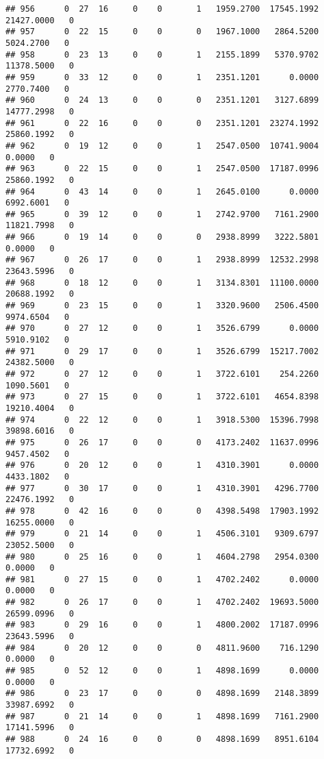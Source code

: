 \documentclass[
]{article}
\begin{document}
\begin{enumerate}
\begin{verbatim}
## 956      0  27  16     0    0       1   1959.2700  17545.1992  21427.0000   0
## 957      0  22  15     0    0       0   1967.1000   2864.5200   5024.2700   0
## 958      0  23  13     0    0       1   2155.1899   5370.9702  11378.5000   0
## 959      0  33  12     0    0       1   2351.1201      0.0000   2770.7400   0
## 960      0  24  13     0    0       0   2351.1201   3127.6899  14777.2998   0
## 961      0  22  16     0    0       0   2351.1201  23274.1992  25860.1992   0
## 962      0  19  12     0    0       1   2547.0500  10741.9004      0.0000   0
## 963      0  22  15     0    0       1   2547.0500  17187.0996  25860.1992   0
## 964      0  43  14     0    0       1   2645.0100      0.0000   6992.6001   0
## 965      0  39  12     0    0       1   2742.9700   7161.2900  11821.7998   0
## 966      0  19  14     0    0       0   2938.8999   3222.5801      0.0000   0
## 967      0  26  17     0    0       1   2938.8999  12532.2998  23643.5996   0
## 968      0  18  12     0    0       1   3134.8301  11100.0000  20688.1992   0
## 969      0  23  15     0    0       1   3320.9600   2506.4500   9974.6504   0
## 970      0  27  12     0    0       1   3526.6799      0.0000   5910.9102   0
## 971      0  29  17     0    0       1   3526.6799  15217.7002  24382.5000   0
## 972      0  27  12     0    0       1   3722.6101    254.2260   1090.5601   0
## 973      0  27  15     0    0       1   3722.6101   4654.8398  19210.4004   0
## 974      0  22  12     0    0       1   3918.5300  15396.7998  39898.6016   0
## 975      0  26  17     0    0       0   4173.2402  11637.0996   9457.4502   0
## 976      0  20  12     0    0       1   4310.3901      0.0000   4433.1802   0
## 977      0  30  17     0    0       1   4310.3901   4296.7700  22476.1992   0
## 978      0  42  16     0    0       0   4398.5498  17903.1992  16255.0000   0
## 979      0  21  14     0    0       1   4506.3101   9309.6797  23052.5000   0
## 980      0  25  16     0    0       1   4604.2798   2954.0300      0.0000   0
## 981      0  27  15     0    0       1   4702.2402      0.0000      0.0000   0
## 982      0  26  17     0    0       1   4702.2402  19693.5000  26599.0996   0
## 983      0  29  16     0    0       1   4800.2002  17187.0996  23643.5996   0
## 984      0  20  12     0    0       0   4811.9600    716.1290      0.0000   0
## 985      0  52  12     0    0       1   4898.1699      0.0000      0.0000   0
## 986      0  23  17     0    0       0   4898.1699   2148.3899  33987.6992   0
## 987      0  21  14     0    0       1   4898.1699   7161.2900  17141.5996   0
## 988      0  24  16     0    0       0   4898.1699   8951.6104  17732.6992   0

\end{verbatim}
\end{enumerate}
\end{document}
